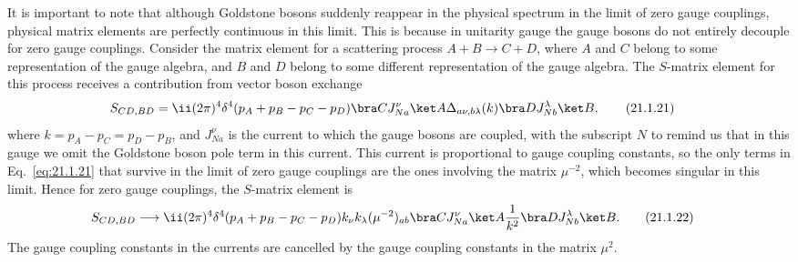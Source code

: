 It is important to note that although Goldstone bosons suddenly reappear in
the physical spectrum in the limit of zero gauge couplings, physical matrix
elements are perfectly continuous in this limit. This is because in
unitarity gauge the gauge bosons do not entirely decouple for zero gauge
couplings. Consider the matrix element for a scattering process
$A+B\to C+D$, where $A$ and $C$ belong to some representation of the gauge
algebra, and $B$ and $D$ belong to some different representation of the
gauge algebra. The $S$-matrix element for this process receives a
contribution from vector boson exchange
\begin{align}
 S_{CD,BD}={}&\ii(2\pi)^4
 \delta^4(p_A+p_B-p_C-p_D)
 \bra C J_{Na}^{\nu}\ket A
 \Delta_{a\nu,b\lambda}(k)
 \bra D J_{Nb}^{\lambda}\ket B,
 \tag{21.1.21}\label{eq:21.1.21}
\end{align}
where $k=p_A-p_C=p_D-p_B$, and $J_{Na}^{\nu}$ is the current to which
the gauge bosons are coupled, with the subscript $N$ to remind us that in
this gauge we omit the Goldstone boson pole term in this current. This
current is proportional to gauge coupling constants, so the only terms in
Eq.~\eqref{eq:21.1.21} that survive in the limit of zero gauge couplings are
the ones involving the matrix $\mu^{-2}$, which becomes singular in this
limit. Hence for zero gauge couplings, the $S$-matrix element is
\begin{align}
 S_{CD,BD}\longrightarrow{}&
 \ii(2\pi)^4\delta^4(p_A+p_B-p_C-p_D)
 k_\nu k_\lambda(\mu^{-2})_{ab}
 \bra C J_{Na}^{\nu}\ket A
 \frac1{k^2}
 \bra D J_{Nb}^{\lambda}\ket B.
 \tag{21.1.22}\label{eq:21.1.22}
\end{align}
The gauge coupling constants in the currents are cancelled by the gauge
coupling constants in the matrix $\mu^2$.

